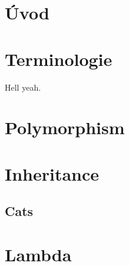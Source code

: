 
\section{Úvod}

\lipsum

\newpage

\section{Terminologie}

\lipsum

\cite{einstein} Hell yeah.

\newpage

\section{Polymorphism}

\lipsum

\newpage

\section{Inheritance}

\lipsum

\subsection{Cats}

\lipsum

\newpage


\section{Lambda}

\lipsum

\newpage


